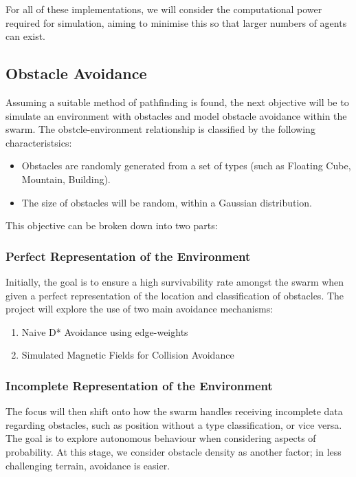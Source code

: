 \documentclass{article}
\begin{document}
For all of these implementations, we will consider the computational power required for simulation, aiming to minimise this so that larger numbers of agents can exist.

\subsection{Obstacle Avoidance}
Assuming a suitable method of pathfinding is found, the next objective will be to simulate an environment with obstacles and model obstacle avoidance within the swarm. The obstcle-environment relationship is classified by the following characteristsics:

\begin{itemize}
    \item Obstacles are randomly generated from a set of types (such as Floating Cube, Mountain, Building).
    \item The size of obstacles will be random, within a Gaussian distribution.
\end{itemize}

This objective can be broken down into two parts:

\subsubsection{Perfect Representation of the Environment}
Initially, the goal is to ensure a high survivability rate amongst the swarm when given a perfect representation of the location and classification of obstacles. The project will explore the use of two main avoidance mechanisms:

\begin{enumerate}
    \item Naive D* Avoidance using edge-weights
    \item Simulated Magnetic Fields for Collision Avoidance\cite{2017}
\end{enumerate}

\subsubsection{Incomplete Representation of the Environment}
The focus will then shift onto how the swarm handles receiving incomplete data regarding obstacles, such as position without a type classification, or vice versa. The goal is to explore autonomous behaviour when considering aspects of probability. At this stage, we consider obstacle density as another factor; in less challenging terrain, avoidance is easier.
\end{document}
